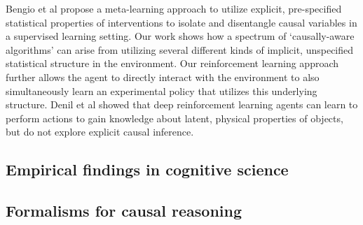 
Bengio et al \citep{bengio2019meta} propose a meta-learning approach to utilize explicit, pre-specified statistical properties of interventions to isolate and disentangle causal variables in a supervised learning setting. Our work shows how a spectrum of `causally-aware algorithms' can arise from utilizing several different kinds of implicit, unspecified statistical structure in the environment. Our reinforcement learning approach further allows the agent to directly interact with the environment to also simultaneously learn an experimental policy that utilizes this underlying structure. Denil et al \citep{denil2016learning} showed that deep reinforcement learning agents can learn to perform actions to gain knowledge about latent, physical properties of objects, but do not explore explicit causal inference.

\subsection{Empirical findings in cognitive science}

\subsection{Formalisms for causal reasoning}

